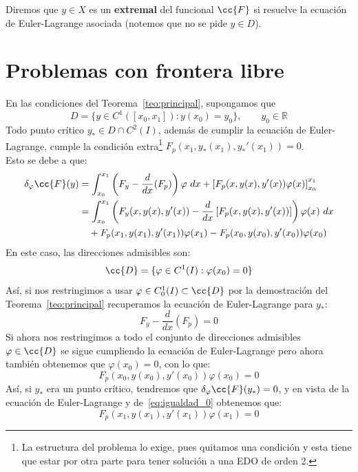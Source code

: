 \begin{definicion}
    Diremos que $y\in X$ es un \textbf{extremal} del funcional $\cc{F}$ si resuelve la ecuación de Euler-Lagrange asociada (notemos que no se pide $y\in D$).
\end{definicion}

\section{Problemas con frontera libre}
\noindent
En las condiciones del Teorema~\ref{teo:principal}, supongamos que 
\begin{equation*}
    D = \{y\in C^1([x_0,x_1]) : y(x_0) = y_0\}, \qquad y_0\in \mathbb{R}
\end{equation*}
Todo punto crítico $y_\ast \in D\cap C^2(I)$, además de cumplir la ecuación de Euler-Lagrange, cumple la condición extra\footnote{La estructura del problema lo exige, pues quitamos una condición y esta tiene que estar por otra parte para tener solución a una EDO de orden 2.} $F_p(x_1,y_\ast(x_1), y_\ast'(x_1)) = 0$.\\

\noindent
Esto se debe a que:
\begin{align*}
    \delta_\varphi \cc{F}(y) &=\int_{x_0}^{x_1} \left(F_y - \frac{d}{dx}(F_p)\right)\varphi~dx + \left[F_p(x,y(x),y'(x))\varphi(x)\right]_{x_0}^{x_1} \\
                             &= \int_{x_0}^{x_1} \left(F_y(x,y(x),y'(x))-\frac{d}{dx}\left[F_p(x,y(x),y'(x))\right]\right)\varphi(x)~dx \\
                             &\quad + F_p(x_1,y(x_1),y'(x_1))\varphi(x_1) - F_p(x_0,y(x_0),y'(x_0))\varphi(x_0) 
\end{align*}
En este caso, las direcciones admisibles son:
\begin{equation*}
    \cc{D} = \{\varphi \in C^1(I) : \varphi(x_0) = 0\}
\end{equation*}
Así, si nos restringimos a usar $\varphi \in C_0^1(I)\subset \cc{D}$ por la demostración del Teorema~\ref{teo:principal} recuperamos la ecuación de Euler-Lagrange para $y_\ast$:
\begin{equation*}
     F_y - \frac{d}{dx}(F_p)  = 0
\end{equation*}
Si ahora nos restringimos a todo el conjunto de direcciones admisibles $\varphi \in \cc{D}$ se sigue cumpliendo la ecuación de Euler-Lagrange pero ahora también obtenemos que $\varphi(x_0) = 0$, con lo que:
\begin{equation}\label{eq:igualdad_0}
     F_p(x_0,y(x_0),y'(x_0))\varphi(x_0)  = 0
\end{equation}
Así, si $y_\ast$ era un punto crítico, tendremos que $\delta_\varphi \cc{F}(y_\ast) = 0$, y en vista de la ecuación de Euler-Lagrange y de~\eqref{eq:igualdad_0} obtenemos que:
\begin{equation*}
     F_p(x_1,y(x_1),y'(x_1))\varphi(x_1)  = 0
\end{equation*}

